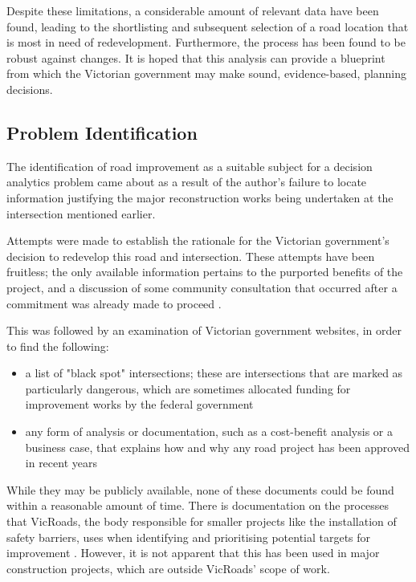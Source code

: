 \documentclass[11pt, a4paper]{article}
\begin{document}
    Despite these limitations, a considerable amount of relevant data have been found, leading to the shortlisting and subsequent selection of a road location that is most in need of redevelopment. Furthermore, the process has been found to be robust against changes. It is hoped that this analysis can provide a blueprint from which the Victorian government may make sound, evidence-based, planning decisions.

    \subsection{Problem Identification}

    The identification of road improvement as a suitable subject for a decision analytics problem came about as a result of the author's failure to locate information justifying the major reconstruction works being undertaken at the intersection mentioned earlier. 

    Attempts were made to establish the rationale for the Victorian government's decision to redevelop this road and intersection. These attempts have been fruitless; the only available information pertains to the purported benefits of the project, and a discussion of some community consultation that occurred after a commitment was already made to proceed \parencite{a7}. 

    This was followed by an examination of Victorian government websites, in order to find the following:

    \begin{itemize}
        \item a list of "black spot" intersections; these are intersections that are marked as particularly dangerous, which are sometimes allocated funding for improvement works by the federal government \parencite{a8}
        \item any form of analysis or documentation, such as a cost-benefit analysis or a business case, that explains how and why any road project has been approved in recent years
    \end{itemize}

    While they may be publicly available, none of these documents could be found within a reasonable amount of time. There is documentation on the processes that VicRoads, the body responsible for smaller projects like the installation of safety barriers, uses when identifying and prioritising potential targets for improvement \parencite{a9}. However, it is not apparent that this has been used in major construction projects, which are outside VicRoads' scope of work.
\end{document}
